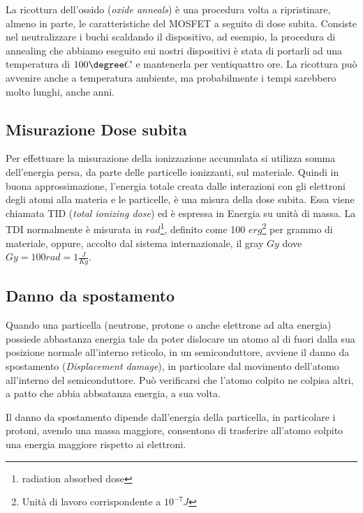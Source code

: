 La ricottura dell'ossido (\textit{oxide anneals}) è una procedura volta a ripristinare, almeno in parte, le caratteristiche del MOSFET a seguito di dose subita.
Consiste nel neutralizzare i buchi scaldando il dispositivo, ad esempio, la procedura di annealing che abbiamo eseguito sui nostri dispositivi è stata di portarli ad una temperatura di $100\degree C$ e mantenerla per ventiquattro ore. La ricottura può avvenire anche a temperatura ambiente, ma probabilmente i tempi sarebbero molto lunghi, anche anni\cite{bib:Effetti_Radiazioni_NASA}. 


\subsection{Misurazione Dose subita}
Per effettuare la misurazione della ionizzazione accumulata si utilizza somma dell'energia persa, da parte delle particelle ionizzanti, sul materiale. Quindi in buona approssimazione, l'energia totale creata dalle interazioni con gli elettroni degli atomi alla materia e le particelle, è una misura della dose subita\cite{bib:Effetti_Radiazioni_NASA}. Essa viene chiamata TID (\textit{total ionizing dose}) ed è espressa in Energia su unità di massa.
La TDI normalmente è misurata in $rad$\footnote{radiation absorbed dose}, definito come 100 $erg$\footnote{Unità di lavoro corrispondente a $10^{-7} J$} per grammo di materiale, oppure, accolto dal sistema internazionale, il gray $Gy$ dove $Gy = 100rad = 1\frac{J}{Kg}$.


\subsection{Danno da spostamento}
Quando una particella (neutrone, protone o anche elettrone ad alta energia) possiede abbastanza energia tale da poter dislocare un atomo al di fuori dalla sua posizione normale all'interno reticolo, in un semiconduttore, avviene il danno da spostamento (\textit{Displacement damage}), in particolare dal movimento dell'atomo all'interno del semiconduttore. Può verificarsi che l'atomo colpito ne colpisa altri, a patto che abbia abbsatanza energia, a sua volta\cite{bib:Effetti_Radiazioni_1987}.

Il danno da spostamento dipende dall'energia della particella, in particolare i protoni, avendo una massa maggiore, consentono di trasferire all'atomo colpito una energia maggiore rispetto ai elettroni\cite{bib:Effetti_Radiazioni_su_dispositivi_optoeltronici}.